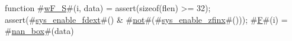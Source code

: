 function #\hyperref[sailRISCVzwFzyS]{wF\_S}#(i, data) = {
  assert(sizeof(flen) >= 32);
  assert(#\hyperref[sailRISCVzsyszyenablezyfdext]{sys\_enable\_fdext}#() & #\hyperref[sailRISCVznot]{not}#(#\hyperref[sailRISCVzsyszyenablezyzzfinx]{sys\_enable\_zfinx}#()));
  #\hyperref[sailRISCVzF]{F}#(i) = #\hyperref[sailRISCVznanzybox]{nan\_box}#(data)
}
